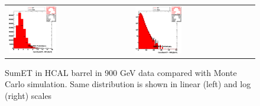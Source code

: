 \begin{figure}[h!]
 \centering
 \begin{tabular}{ll}
  \includegraphics[width=0.40\textwidth]{plots_DataVsMC_MB_900GeV/h_caloSumetHB_lin.eps} &
  \includegraphics[width=0.40\textwidth]{plots_DataVsMC_MB_900GeV/h_caloSumetHB.eps} \\
 \end{tabular}
 \caption{SumET in HCAL barrel in 900 GeV data compared
   with Monte Carlo simulation. Same distribution is shown in linear (left) and log (right) scales
          \label{fig:DataVsMC_MB_900_7}}
\end{figure}

